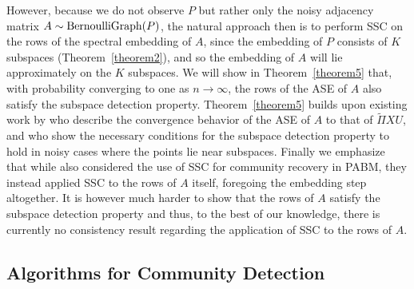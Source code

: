 \documentclass[12pt]{article}
\begin{document}
However, because we do not observe $P$ but rather only the noisy
adjacency matrix $A \sim \mathrm{BernoulliGraph}(P)$, the natural approach then is
to perform SSC on the rows of the spectral embedding of $A$, 
since the embedding of $P$ consists of $K$ subspaces (Theorem~\ref{theorem2}), 
and so the embedding of $A$ will lie approximately on the $K$ subspaces. 
We will show in Theorem~\ref{theorem5} that, with probability converging to
one as $n \rightarrow \infty$, the rows of the ASE of $A$ also
satisfy the subspace detection property. 
Theorem~\ref{theorem5} builds upon existing work by
\citet{rubindelanchy2017statistical} who describe the convergence
behavior of the ASE of \(A\) to that of \(\tilde{\Pi} XU\), and
\citet{jmlr-v28-wang13} who show the necessary conditions for the
subspace detection property to hold in noisy cases where the points lie
near subspaces. Finally we emphasize that while
\citet{noroozi2019estimation} also considered the use of SSC for
community recovery in PABM, they instead applied SSC to the rows of
\(A\) itself, foregoing
the embedding step altogether. It is however much harder to show that
the rows of $A$ satisfy the subspace detection property and thus, to
the best of our knowledge, there is currently no consistency result
regarding the application of SSC to the rows of $A$. 

\hypertarget{community-detection}{%
\subsection{Algorithms for Community Detection}\label{community-detection}}
\end{document}

